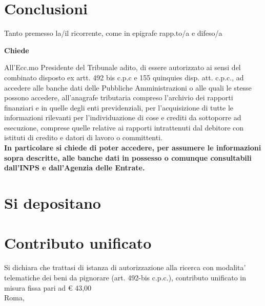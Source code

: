 \documentclass [12pt]{article}
\begin{document}
\section{Conclusioni}\label{conclusioni} 
Tanto premesso la/il ricorrente, come in epigrafe rapp.to/a e difeso/a
\begin{center}
\textbf{Chiede}
\end{center}
All’Ecc.mo Presidente del Tribunale adito, di essere autorizzato ai sensi del combinato disposto ex artt. 492 bis c.p.c e 155 quinquies disp. att. c.p.c., ad accedere alle banche dati delle Pubbliche Amministrazioni o alle quali le stesse possono accedere, all’anagrafe tributaria compreso l’archivio dei rapporti finanziari e in quelle degli enti previdenziali, per l’acquisizione di tutte le informazioni rilevanti per l’individuazione di cose e crediti da sottoporre ad esecuzione, comprese quelle relative ai rapporti intrattenuti dal debitore con istituti di credito e datori di lavoro o committenti.\\ 
\textbf{In particolare si chiede di poter accedere, per assumere le informazioni sopra descritte, alle banche dati in possesso o comunque consultabili dall’INPS e dall’Agenzia delle Entrate.}
\section{Si depositano}\label{documenti} 
\section{Contributo unificato}\label{contributo unificato}
Si dichiara che trattasi di istanza di autorizzazione alla ricerca con modalita' telematiche dei beni da pignorare (art. 492-bis c.p.c.), contributo unificato in misura fissa pari ad € 43,00\\
Roma, \makeatletter
\@date
\begin{flushright}
\makeatletter
\@author
\end{flushright}
\end{document}
